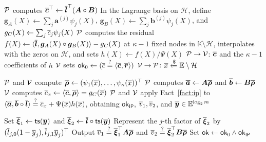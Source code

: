\begin{algorithm}[!t]
\caption{Packed Hadamard-product proof}
\label{alg:hadamard}

\(\mathcal{P}\) computes
\(\overline{\bm c}^{\top}\leftarrow
\overline{\bm l}^{\top}(\bm A\circ\bm B)\)\;
In the Lagrange basis on \(\mathcal H\), define
\(\bm g_A(X)\leftarrow\sum_j\bm a^{(j)}\psi_j(X)\),
\(\bm g_B(X)\leftarrow\sum_j\bm b^{(j)}\psi_j(X)\), and
\(g_C(X)\leftarrow\sum_j\overline{c}_j\psi_j(X)\)\;
\(\mathcal{P}\) computes the residual
\(f(X)\leftarrow
\langle\overline{\bm l},\bm g_A(X)\circ\bm g_B(X)\rangle-g_C(X)\)
at \(\kappa-1\) fixed nodes in \(\mathbb K\setminus\mathcal H\),
interpolates with the zeros on \(\mathcal H\), and sets
\(h(X)\leftarrow f(X)/\Psi(X)\)\;
\({\mathcal{P} \rightarrow \mathcal{V}}\): \(\overline{\bm c}\) and the \(\kappa-1\) coefficients of \(h\)\;
\(\mathcal{V}\) sets
\(\mathsf{ok}_0\leftarrow
(\overline{c}\mathrel{\overset{\mathrm{?}}{=}}\langle\overline{\bm c},\overline{\bm r}\rangle)\)\;
\({\mathcal{V} \rightarrow \mathcal{P}}\): \(\overline{x}\mathrel{\xleftarrow{\$}}\mathbb{E}\setminus\mathcal H\)\;

\(\mathcal{P}\) and \(\mathcal{V}\) compute
\(\overline{\bm\rho}\leftarrow
(\psi_1(\overline{x}),\ldots,\psi_\kappa(\overline{x}))^\top\)\;
\(\mathcal{P}\) computes
\(\overline{\bm a}\leftarrow\bm A\overline{\bm\rho}\) and
\(\overline{\bm b}\leftarrow\bm B\overline{\bm\rho}\)\;
\(\mathcal{V}\) computes
\(\overline{c}_x\leftarrow
\langle\overline{\bm c},\overline{\bm\rho}\rangle=g_C(\overline{x})\)\;
\(\mathcal{P}\) and \(\mathcal{V}\) apply Fact~\ref{fact:ip} to
\(\langle\overline{\bm a},\overline{\bm b}\circ\overline{\bm l}\rangle
\mathrel{\overset{\mathrm{?}}{=}}\overline{c}_x+\Psi(\overline{x})h(\overline{x})\),
obtaining \(\mathsf{ok}_{\mathsf{IP}}\),
\(\overline{v}_1,\overline{v}_2\), and
\(\overline{\bm y}\in\mathbb{E}^{\log_2m}\)\;

Set
\(\overline{\bm\xi}_1\leftarrow{\sf ts}(\overline{\bm y})\) and
\(\overline{\bm\xi}_2\leftarrow
\overline{\bm l}\circ{\sf ts}(\overline{\bm y})\)\;
Represent the \(j\)-th factor of \(\overline{\bm\xi}_2\) by
\((\overline{l}_{j,0}(1-\overline{y}_j),\overline{l}_{j,1}\overline{y}_j)^\top\)\;
Output
\(\overline{v}_1\mathrel{\overset{\mathrm{?}}{=}}\overline{\bm\xi}_1^\top\bm A\overline{\bm\rho}\)
and
\(\overline{v}_2\mathrel{\overset{\mathrm{?}}{=}}\overline{\bm\xi}_2^\top\bm B\overline{\bm\rho}\)\;
Set
\(\mathsf{ok}\leftarrow\mathsf{ok}_0\wedge\mathsf{ok}_{\mathsf{IP}}\)\;
\;
\end{algorithm}
